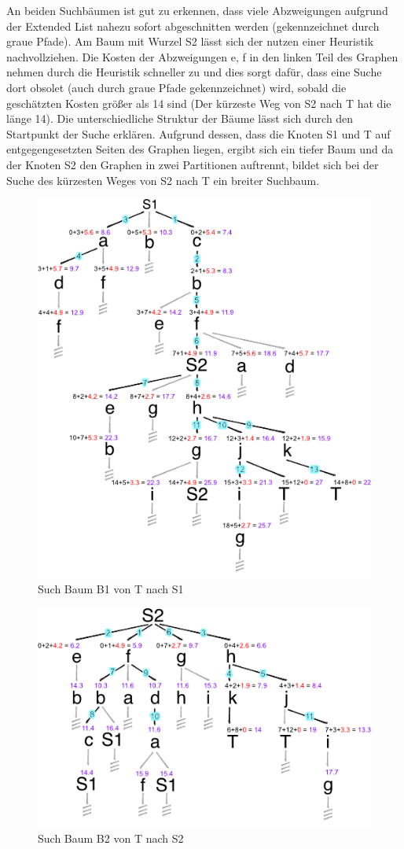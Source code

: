 An beiden Suchb\"aumen ist gut zu erkennen, dass viele Abzweigungen aufgrund der Extended List nahezu sofort abgeschnitten werden (gekennzeichnet durch graue Pfade). Am Baum mit Wurzel S2 l\"asst sich der nutzen einer Heuristik nachvollziehen. Die Kosten der Abzweigungen e, f in den linken Teil des Graphen nehmen durch die Heuristik schneller zu und dies sorgt daf\"ur, dass eine Suche dort obsolet (auch durch graue Pfade gekennzeichnet) wird, sobald die gesch\"atzten Kosten gr\"o\ss er als 14 sind (Der k\"urzeste Weg von S2 nach T hat die l\"ange 14). 
Die unterschiedliche Struktur der B\"aume l\"asst sich durch den Startpunkt der Suche erkl\"aren. Aufgrund dessen, dass die Knoten S1 und T auf entgegengesetzten Seiten des Graphen liegen, ergibt sich ein tiefer Baum und da der Knoten S2 den Graphen in zwei Partitionen auftrennt, bildet sich bei der Suche des k\"urzesten Weges von S2 nach T ein breiter Suchbaum. 
\begin{figure}[h!]
	\centering
	\includegraphics[scale=0.9]{chapters/informed_search/AStarBaum1.png}
	\caption{Such Baum B1 von T nach S1}
	\label{fig:searchtrees1}
\end{figure}

\begin{figure}[h!]
	\centering
	\includegraphics[scale=0.9]{chapters/informed_search/AStarBaum2.png}
	\caption{Such Baum B2 von T nach S2}
	\label{fig:searchtrees2}
\end{figure}
\newpage 